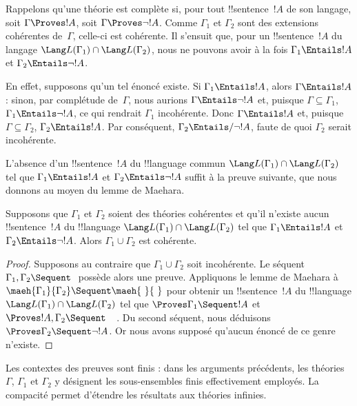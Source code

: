 \documentclass[../../../include/open-logic-section]{subfiles}
\begin{document}
Rappelons qu'une théorie est complète si, pour tout
!!{sentence}~$!A$ de son langage, soit $\Gamma \Proves !A$, soit
$\Gamma \Proves \lnot !A$. Comme $\Gamma_1$ et $\Gamma_2$ sont
des extensions cohérentes de~$\Gamma$, celle-ci est cohérente.
Il s'ensuit que, pour un !!{sentence}~$!A$ du langage
$\Lang L(\Gamma_1) \cap \Lang L(\Gamma_2)$,
nous ne pouvons avoir à la fois $\Gamma_1 \Entails !A$ et
$\Gamma_2 \Entails \lnot !A$.

En effet, supposons qu'un tel énoncé existe. Si
$\Gamma_1 \Entails !A$, alors $\Gamma \Entails !A$ :
sinon, par complétude de~$\Gamma$, nous aurions
$\Gamma \Entails \lnot !A$ et, puisque $\Gamma \subseteq \Gamma_1$,
$\Gamma_1 \Entails \lnot !A$, ce qui rendrait $\Gamma_1$ incohérente.
Donc $\Gamma \Entails !A$ et, puisque $\Gamma \subseteq \Gamma_2$,
$\Gamma_2 \Entails !A$. Par conséquent,
$\Gamma_2 \Entails/ \lnot !A$, faute de quoi $\Gamma_2$
serait incohérente.

L'absence d'un !!{sentence}~$!A$ du !!{language} commun
$\Lang L(\Gamma_1) \cap \Lang L(\Gamma_2)$ tel que
$\Gamma_1 \Entails !A$ et $\Gamma_2 \Entails \lnot !A$
suffit à la preuve suivante, que nous donnons au moyen du
lemme de Maehara.

\begin{thm}
Supposons que $\Gamma_1$ et $\Gamma_2$ soient des théories
cohérentes et qu'il n'existe aucun !!{sentence}~$!A$ du
!!{language} $\Lang L(\Gamma_1) \cap \Lang L(\Gamma_2)$ tel que
$\Gamma_1 \Entails !A$ et $\Gamma_2 \Entails \lnot !A$.
Alors $\Gamma_1 \cup \Gamma_2$ est cohérente.
\end{thm}

\begin{proof}
Supposons au contraire que $\Gamma_1 \cup \Gamma_2$ soit incohérente.
Le séquent $\Gamma_1, \Gamma_2 \Sequent \ $ possède alors une preuve.
Appliquons le lemme de Maehara à
$\maeh{\Gamma_1}{\Gamma_2} \Sequent \maeh{\ }{\ }$ pour obtenir
un !!{sentence}~$!A$ du !!{language}
$\Lang L(\Gamma_1) \cap \Lang L(\Gamma_2)$ tel que
$\Proves \Gamma_1 \Sequent !A$ et
$\Proves !A, \Gamma_2 \Sequent \quad$.
Du second séquent, nous déduisons
$\Proves \Gamma_2 \Sequent \lnot !A$.
Or nous avons supposé qu'aucun énoncé de ce genre n'existe.
\end{proof}

Les contextes des preuves sont finis : dans les arguments précédents,
les théories $\Gamma$, $\Gamma_1$ et $\Gamma_2$ y désignent les
sous-ensembles finis effectivement employés. La compacité permet
d'étendre les résultats aux théories infinies.
\end{document}
